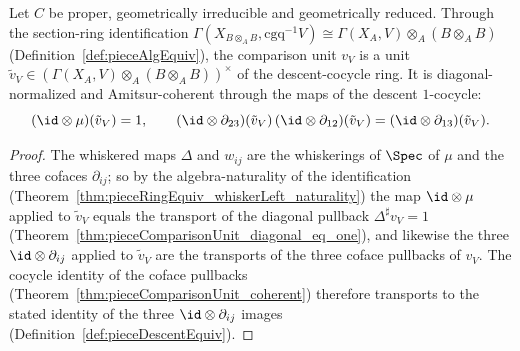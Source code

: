 \begin{theorem}
  \label{thm:pieceComparisonTensorUnit}
  \leanok
  Let \(C\) be proper, geometrically irreducible and geometrically reduced. Through the section-ring
  identification \(\Gamma(X_{B \otimes_A B}, \mathrm{cgq}^{-1}V) \cong \Gamma(X_A, V) \otimes_A (B
  \otimes_A B)\) (Definition~\ref{def:pieceAlgEquiv}), the comparison unit \(v_V\) is a unit
  \(\tilde v_V \in (\Gamma(X_A, V) \otimes_A (B \otimes_A B))^{\times}\) of the descent-cocycle ring.
  It is diagonal-normalized and Amitsur-coherent through the maps of the descent \(1\)-cocycle:
  \[
    (\id \otimes \mu)(\tilde v_V) = 1, \qquad
    (\id \otimes \partial_{23})(\tilde v_V)\,(\id \otimes \partial_{12})(\tilde v_V)
      = (\id \otimes \partial_{13})(\tilde v_V) .
  \]
\end{theorem}
\begin{proof}
  \leanok
  The whiskered maps \(\Delta\) and \(w_{ij}\) are the whiskerings of \(\Spec\) of \(\mu\) and the
  three cofaces \(\partial_{ij}\); so by the algebra-naturality of the identification
  (Theorem~\ref{thm:pieceRingEquiv_whiskerLeft_naturality}) the map \(\id \otimes \mu\) applied to
  \(\tilde v_V\) equals the transport of the diagonal pullback \(\Delta^{\sharp}v_V = 1\)
  (Theorem~\ref{thm:pieceComparisonUnit_diagonal_eq_one}), and likewise the three \(\id \otimes
  \partial_{ij}\) applied to \(\tilde v_V\) are the transports of the three coface pullbacks of
  \(v_V\). The cocycle identity of the coface pullbacks
  (Theorem~\ref{thm:pieceComparisonUnit_coherent}) therefore transports to the stated identity of
  the three \(\id \otimes \partial_{ij}\) images (Definition~\ref{def:pieceDescentEquiv}).
\end{proof}

